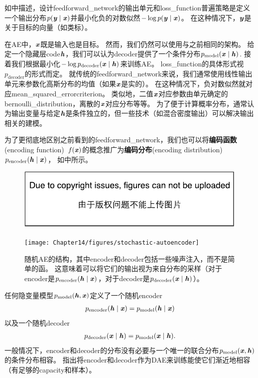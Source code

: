 如中描述，设计\gls{feedforward_network}的输出单元和\gls{loss_function}普遍策略是定义一个输出分布$p(\boldsymbol{\mathit{y}} \mid \boldsymbol{\mathit{x}}) $并最小化负的对数似然$-\log p(\boldsymbol{\mathit{y}} \mid \boldsymbol{\mathit{x}})$。
在这种情况下，$\boldsymbol{\mathit{y}}$是关于目标的向量（如类标）。


在\gls{AE}中，$\boldsymbol{\mathit{x}}$既是输入也是目标。
然而，我们仍然可以使用与之前相同的架构。
给定一个隐藏层\gls{code}$\boldsymbol{\mathit{h}}$，我们可以认为\gls{decoder}提供了一个条件分布$p_{\text{model}}(\boldsymbol{\mathit{x}} \mid \boldsymbol{\mathit{h}})$. 
接着我们根据最小化$-\log p_{\text{decoder}}(\boldsymbol{\mathit{x}} \mid \boldsymbol{\mathit{h}})$来训练\gls{AE}。
\gls{loss_function}的具体形式视$p_{\text{decoder}}$的形式而定。
就传统的\gls{feedforward_network}来说，我们通常使用线性输出单元来参数化高斯分布的均值（如果$\boldsymbol{\mathit{x}}$是实的）。
在这种情况下，负对数似然就对应\gls{mean_squared_error}\gls{criterion}。
类似地，二值$\boldsymbol{\mathit{x}}$对应参数由单元确定的\gls{bernoulli_distribution}，离散的$\boldsymbol{\mathit{x}}$对应分布等等。
为了便于计算概率分布，通常认为输出变量与给定$\boldsymbol{\mathit{h}}$是条件独立的，但一些技术（如混合密度输出）可以解决输出相关的建模。


为了更彻底地区别之前看到的\gls{feedforward_network}，我们也可以将\textbf{编码函数}(encoding function)~$f(\boldsymbol{\mathit{x}})$的概念推广为\textbf{编码分布}(encoding distribution)~$ p_{\text{encoder}}(\boldsymbol{\mathit{h}} \mid \boldsymbol{\mathit{x}})$， 如中所示。

\begin{figure}[!htb]
\ifOpenSource
\centerline{\includegraphics{figure.pdf}}
\else
\centerline{\texttt{[image: Chapter14/figures/stochastic-autoencoder]}}
\fi
\caption{随机\gls{AE}的结构，其中\gls{encoder}和\gls{decoder}包括一些噪声注入，而不是简单的函。
这意味着可以将它们的输出视为来自分布的采样（对于\gls{encoder}是$p_{\text{encoder}}(\boldsymbol{\mathit{h}} \mid \boldsymbol{\mathit{x}})$，对于\gls{decoder}是$p_{\text{decoder}}(\boldsymbol{\mathit{x}}\mid \boldsymbol{\mathit{h}})$）。}
\label{fig:chap14_stochastic-autoencoder}
\end{figure}

任何隐变量模型$p_{\text{model}}(\boldsymbol{\mathit{h}}, \boldsymbol{\mathit{x}})$定义了一个随机\gls{encoder}
\begin{align}
p_{\text{encoder}}(\boldsymbol{\mathit{h}} \mid \boldsymbol{\mathit{x}}) = p_{\text{model}}(\boldsymbol{\mathit{h}}\mid\boldsymbol{\mathit{x}})
\end{align}
以及一个随机\gls{decoder}
\begin{align}
p_{\text{decoder}}(\boldsymbol{\mathit{x}} \mid \boldsymbol{\mathit{h}}) = p_{\text{model}}(\boldsymbol{\mathit{x}}\mid\boldsymbol{\mathit{h}}).
\end{align}
一般情况下，\gls{encoder}和\gls{decoder}的分布没有必要与一个唯一的联合分布$p_{\text{model}}(\boldsymbol{\mathit{x}}, \boldsymbol{\mathit{h}})$的条件分布相容。
\citet{Alain-et-al-arxiv2015}指出将\gls{encoder}和\gls{decoder}作为\gls{DAE}来训练能使它们渐近地相容（有足够的\gls{capacity}和样本）。



